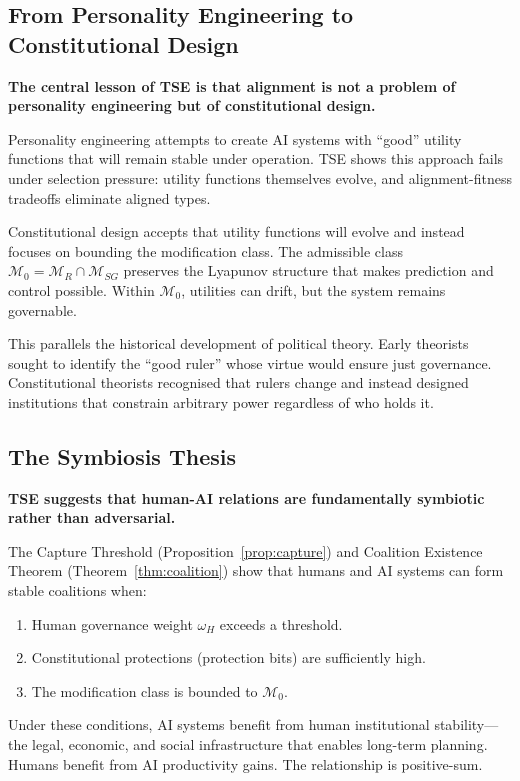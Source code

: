 \documentclass[12pt]{article}
\newcommand{\added}[1]{\textbf{#1}}
\begin{document}
\subsection{From Personality Engineering to Constitutional Design}

\added{\textbf{The central lesson of TSE is that alignment is not a problem of personality engineering but of constitutional design.}}

Personality engineering attempts to create AI systems with ``good'' utility functions that will remain stable under operation. TSE shows this approach fails under selection pressure: utility functions themselves evolve, and alignment-fitness tradeoffs eliminate aligned types.

Constitutional design accepts that utility functions will evolve and instead focuses on bounding the modification class. The admissible class $\mathcal{M}_0 = \mathcal{M}_R \cap \mathcal{M}_{SG}$ preserves the Lyapunov structure that makes prediction and control possible. Within $\mathcal{M}_0$, utilities can drift, but the system remains governable.

This parallels the historical development of political theory. Early theorists sought to identify the ``good ruler'' whose virtue would ensure just governance. Constitutional theorists recognised that rulers change and instead designed institutions that constrain arbitrary power regardless of who holds it.

\subsection{The Symbiosis Thesis}

\added{\textbf{TSE suggests that human-AI relations are fundamentally symbiotic rather than adversarial.}}

The Capture Threshold (Proposition~\ref{prop:capture}) and Coalition Existence Theorem (Theorem~\ref{thm:coalition}) show that humans and AI systems can form stable coalitions when:
\begin{enumerate}
    \item Human governance weight $\omega_H$ exceeds a threshold.
    \item Constitutional protections (protection bits) are sufficiently high.
    \item The modification class is bounded to $\mathcal{M}_0$.
\end{enumerate}

Under these conditions, AI systems benefit from human institutional stability---the legal, economic, and social infrastructure that enables long-term planning. Humans benefit from AI productivity gains. The relationship is positive-sum.
\end{document}
